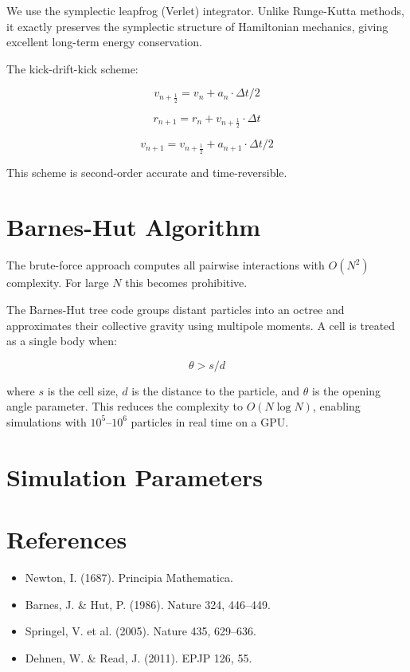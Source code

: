 We use the symplectic leapfrog (Verlet) integrator. Unlike Runge-Kutta
methods, it exactly preserves the symplectic structure of Hamiltonian
mechanics, giving excellent long-term energy conservation.

The kick-drift-kick scheme:

\begin{equation}
v_{n+\frac{1}{2}} = v_n + a_n \cdot \Delta t / 2
\end{equation}

\begin{equation}
r_{n+1} = r_n + v_{n+\frac{1}{2}} \cdot \Delta t
\end{equation}

\begin{equation}
v_{n+1} = v_{n+\frac{1}{2}} + a_{n+1} \cdot \Delta t / 2
\end{equation}

This scheme is second-order accurate and time-reversible.

\section{Barnes-Hut Algorithm}

The brute-force approach computes all pairwise interactions with
$O(N^2)$ complexity. For large $N$ this becomes prohibitive.

The Barnes-Hut tree code groups distant particles into an octree and
approximates their collective gravity using multipole moments. A cell
is treated as a single body when:

\begin{equation}
\theta > s / d
\end{equation}

where $s$ is the cell size, $d$ is the distance to the particle, and
$\theta$ is the opening angle parameter. This reduces the complexity
to $O(N \log N)$, enabling simulations with $10^5$--$10^6$ particles
in real time on a GPU.

\section{Simulation Parameters}


\section{References}

\begin{itemize}
\item Newton, I. (1687). Principia Mathematica.
\item Barnes, J. \& Hut, P. (1986). Nature 324, 446--449.
\item Springel, V. et al. (2005). Nature 435, 629--636.
\item Dehnen, W. \& Read, J. (2011). EPJP 126, 55.
\end{itemize}
